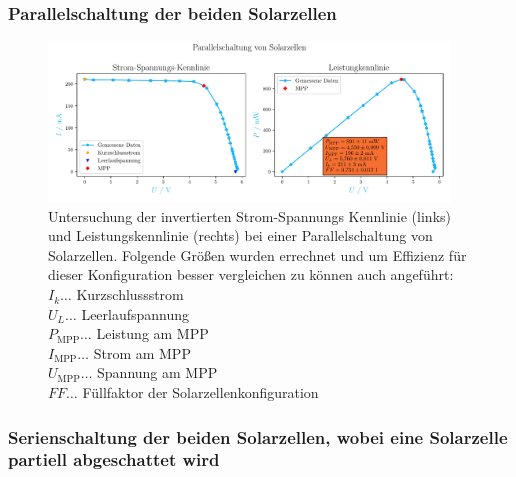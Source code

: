 \documentclass[12pt,english,ngerman]{scrartcl}
\begin{document}
\subsubsection{Parallelschaltung der beiden Solarzellen}
\begin{figure}[H]
	\centering
	\includegraphics[width=0.95\textwidth]{figures/parallelschaltung.pdf}
	\caption[Kennlinien Parallelschaltung Solarzellen]{Untersuchung der invertierten
		Strom-Spannungs Kennlinie (links) und Leistungskennlinie (rechts) bei einer
		Parallelschaltung von Solarzellen. Folgende Größen wurden errechnet und um
		Effizienz für dieser Konfiguration besser vergleichen zu können auch angeführt: \\
		$I_k \dots$ Kurzschlussstrom                                                    \\
		$U_L \dots$ Leerlaufspannung                                                    \\
		$P_\text{MPP} \dots$ Leistung am MPP                                            \\
		$I_\text{MPP} \dots$ Strom am MPP                                               \\
		$U_\text{MPP} \dots$ Spannung am MPP                                            \\
		$FF \dots$ Füllfaktor der Solarzellenkonfiguration
	}\label{fig:auws_kennlinie_parallel}
\end{figure}

\subsubsection{Serienschaltung der beiden Solarzellen, wobei eine Solarzelle partiell abgeschattet wird}
\end{document}
